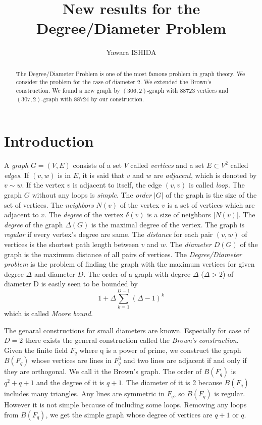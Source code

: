 \documentclass{article}
\title{New results for the Degree/Diameter Problem}
\author{Yawara ISHIDA}
\begin{document}
\maketitle
\begin{abstract}
The Degree/Diameter Problem is one of the most famous problem in graph theory. 
We consider the problem for the case of diameter 2.
We extended the Brown's construction.
We found a new graph by $(306,2)$-graph with $88723$ vertices and $(307,2)$-graph with $88724$ by our construction.
\end{abstract}

\section{Introduction}
A {\it graph} $G=(V,E)$ consists of a set $V$ called {\it vertices} and a set $E \subset V^2$ called {\it edges}.
If $(v,w)$ is in $E$, it is said that $v$ and $w$ are {\it adjacent}, which is denoted by $v \sim w$.
If the vertex $v$ is adjacent to itself, the edge $(v,v)$ is called {\it loop}.
The graph $G$ without any loops is {\it simple}.
The {\it order} $|G|$ of the graph is the size of the set of vertices. 
The {\it neighbors} $N(v)$ of the vertex $v$ is a set of vertices which are adjacent to $v$.
The {\it degree} of the vertex $\delta(v)$ is a size of neighbors $| N(v) |$.  
The {\it degree} of the graph $\Delta(G)$ is the maximal degree  of the vertex.
The graph is {\it regular} if every vertex's degree are same.
The {\it distance} for each pair $(v,w)$ of vertices is the shortest path length between $v$ and $w$. 
The {\it diameter} $D(G)$ of the graph is the  maximum distance of all pairs of vertices. 
The {\it Degree/Diameter problem} is the problem of finding the graph with the maximum vertices for given degree $\Delta$ and diameter $D$. 
The order of a graph with degree $\Delta$ ($\Delta > 2$) of diameter D is easily seen to be bounded by 
\[ 1 + \Delta \sum_{k=1}^{D-1} (\Delta - 1)^k\]
which is called {\it Moore bound}.

The genaral constructions for small diameters are known. Especially for case of  $D=2$ there exists the general construction called the {\it Brown's construction}.
Given the finite field $F_q$ where q is a power of prime, we construct the graph $B(F_q)$ whose vertices are lines in $F_q^3$ and two lines are adjacent if and only if they are orthogonal. 
We call it the Brown's graph.
The order of $B(F_q)$ is $q^2+q+1$ and the degree of it is $q+1$. The diameter of it is 2 because $B(F_q)$ includes many triangles. 
Any lines are symmetric in $F_q$, so $B(F_q)$ is regular. However it is not simple because of including some loops. 
Removing any loops from $B(F_q)$, we get the simple graph whose degree of vertices are $q+1$ or $q$. 
\end{document}
